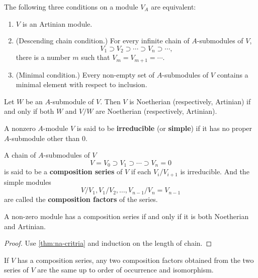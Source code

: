 \begin{theorem}
    The following three conditions on a module $V_A$ are equivalent:
    \begin{enumerate}
        \item[(1)] $V$ is an Artinian module.
        \item[(2)] (Descending chain condition.) For every infinite chain of $A$-submodules of $V$,
        \[
            V_1 \supset V_2 \supset \cdots \supset V_n \supset \cdots,
        \]
        there is a number $m$ such that $V_m = V_{m+1} = \cdots$.
        \item[(3)] (Minimal condition.) Every non-empty set of $A$-submodules of $V$ contains a minimal element with respect to inclusion.
    \end{enumerate}
\end{theorem}

\begin{theorem}\label{thm:na-critria}
Let $W$ be an $A$-submodule of $V$. Then $V$ is Noetherian (respectively, Artinian) if and only if both $W$ and $V/W$ are Noetherian (respectively, Artinian).
\end{theorem}

\begin{definition}
A nonzero $A$-module $V$ is said to be \textbf{irreducible} (or \textbf{simple}) if it has no proper $A$-submodule other than $0$. 

A chain of $A$-submodules of $V$
$$V = V_0 \supset V_1 \supset \cdots \supset V_n = 0$$
is said to be a \textbf{composition series} of $V$ if each $V_i/V_{i+1}$ is irreducible. And the simple modules
$$V/V_1, V_1/V_2, \dots, V_{n-1}/V_n = V_{n-1}$$
are called the \textbf{composition factors} of the series.
\end{definition}

\begin{theorem}
A non-zero module has a composition series if and only if it is both Noetherian and Artinian.
\end{theorem}
\begin{proof}
    Use \autoref{thm:na-critria} and induction on the length of chain.
\end{proof}

\begin{theorem}
If \(V\) has a composition series, any two composition factors obtained
from the two series of \(V\) are the same up to order of occurrence and
isomorphism.
\end{theorem}



